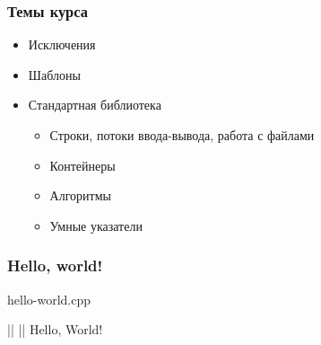\documentclass[compress]{beamer}
\begin{document}
\begin{frame}

    \frametitle{Темы курса}

    \begin{itemize}

        \item Исключения

        \item Шаблоны

        \item Стандартная библиотека

            \begin{itemize}

                \item Строки, потоки ввода-вывода, работа с файлами

                \item Контейнеры

                \item Алгоритмы

                \item Умные указатели

            \end{itemize}

    \end{itemize}

\end{frame}

\begin{frame}[fragile]

    \frametitle{Hello, world!}

        {hello-world.cpp}

    \begin{consolewindow}[\footnotesize]
||
||
Hello, World!
    \end{consolewindow}

\end{frame}
\end{document}
